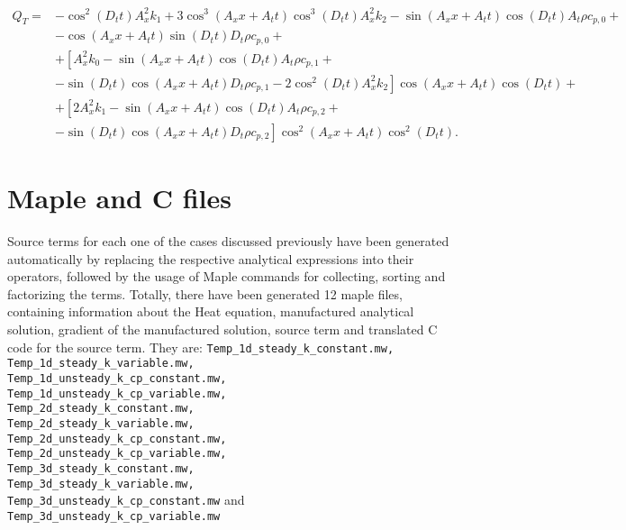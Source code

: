 \documentclass[a4paper,10pt]{article}
\begin{document}
\begin{equation}
\begin{split}
 Q_T = &-\cos^2(D_t t) A_x^2 k_1+3 \cos^3(A_x x+A_t t)\cos^3(D_t t) A_x^2 k_2-\sin(A_x x+A_t t) \cos(D_t t) A_t \rho c_{p,0}+\\
&-\cos(A_x x+A_t t) \sin(D_t t) D_t \rho c_{p,0}+\\
&+ \left[A_x^2 k_0-\sin(A_x x+A_t t) \cos(D_t t) A_t \rho c_{p,1}\right.+\\
    &-\left.\sin(D_t t) \cos(A_x x+A_t t) D_t \rho c_{p,1} -2 \cos^2(D_t t) A_x^2 k_2\right] \cos(A_x x+A_t t) \cos(D_t t)+\\
&+\left[2 A_x^2 k_1-\sin(A_x x+A_t t) \cos(D_t t) A_t \rho c_{p,2} \right. +\\
    &-\left.\sin(D_t t) \cos(A_x x+A_t t) D_t \rho c_{p,2} \right] \cos^2(A_x x+A_t t) \cos^2(D_t t).
\end{split}
\end{equation}


\section{Maple and C files}



Source terms for each one of the cases discussed previously have been generated automatically by replacing the respective analytical expressions into their operators, followed by the usage of Maple commands for collecting, sorting and factorizing the terms. Totally, there have been generated 12 maple files, containing information about the Heat equation, manufactured analytical solution, gradient of the manufactured solution, source term and translated C code for the source term. They are:
{\tt Temp\_1d\_steady\_k\_constant.mw, \\Temp\_1d\_steady\_k\_variable.mw, \\Temp\_1d\_unsteady\_k\_cp\_constant.mw,\\ Temp\_1d\_unsteady\_k\_cp\_variable.mw, \\Temp\_2d\_steady\_k\_constant.mw, \\Temp\_2d\_steady\_k\_variable.mw,\\ Temp\_2d\_unsteady\_k\_cp\_constant.mw, \\ Temp\_2d\_unsteady\_k\_cp\_variable.mw,\\  Temp\_3d\_steady\_k\_constant.mw, \\ Temp\_3d\_steady\_k\_variable.mw,\\  Temp\_3d\_unsteady\_k\_cp\_constant.mw} and\\ {\tt Temp\_3d\_unsteady\_k\_cp\_variable.mw}
\end{document}
